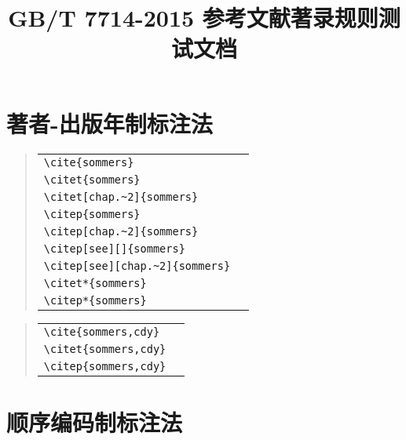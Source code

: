 \documentclass[UTF8,a4paper,zihao=5]{ctexart}
\begin{document}
\title{GB/T 7714-2015 参考文献著录规则测试文档}
\date{}
\maketitle

\section{著者-出版年制标注法}

\begin{quote}
\begin{tabular}{l@{\quad$\Rightarrow$\quad}l}
  \verb|\cite{sommers}| & \cite{sommers}\\
  \verb|\citet{sommers}| & \citet{sommers}\\
  \verb|\citet[chap.~2]{sommers}| & \citet[chap.~2]{sommers}\\[0.5ex]
  \verb|\citep{sommers}| & \citep{sommers}\\
  \verb|\citep[chap.~2]{sommers}| & \citep[chap.~2]{sommers}\\
  \verb|\citep[see][]{sommers}| & \citep[see][]{sommers}\\
  \verb|\citep[see][chap.~2]{sommers}| & \citep[see][chap.~2]{sommers}\\[0.5ex]
  \verb|\citet*{sommers}| & \citet*{sommers}\\
  \verb|\citep*{sommers}| & \citep*{sommers}
\end{tabular}
\end{quote}
\begin{quote}
\begin{tabular}{l@{\quad$\Rightarrow$\quad}l}
  \verb|\cite{sommers,cdy}| & \cite{sommers,cdy}\\
  \verb|\citet{sommers,cdy}| & \citet{sommers,cdy}\\
  \verb|\citep{sommers,cdy}| & \citep{sommers,cdy}
\end{tabular}
\end{quote}

\section{顺序编码制标注法}
\end{document}
